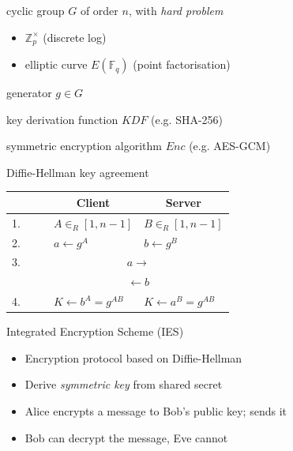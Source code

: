 \documentclass[ignorenonframetext,aspectratio=169]{beamer}
\begin{document}
\item cyclic group \(G\) of order \(n\), with \emph{hard problem}
  \begin{itemize}
  \item \(ℤ^\times_p\) (discrete log)
  \item elliptic curve \(E(𝔽_q)\) (point factorisation)
  \end{itemize}
\item generator \(g \in G\)
\item key derivation function $KDF$ (e.g. SHA-256)
\item symmetric encryption algorithm \(Enc\) (e.g. AES-GCM)

\begin{frame}{Diffie-Hellman key agreement}
\protect\hypertarget{diffie-hellman}{}
\begin{center}
\def\arraystretch{1.5}%
\begin{tabular}{ l l l }
    ~ & \multicolumn{1}{c}{Client} & \multicolumn{1}{c}{Server} \\ \hline
    {\small 1.~~~~} & $A \in_R [1, n-1]$ & $B \in_R [1, n-1]$ \\
    {\small 2.~~~~} & $a \gets g^A$      & $b \gets g^B$ \\
    {\small 3.~~~~} & \multicolumn{2}{c}{$ a \to $} \\
                    & \multicolumn{2}{c}{$ \gets b $} \\
    {\small 4.~~~~} & $ K \gets b^A = g^{AB} $ & $ K \gets a^B = g^{AB} $ \\
\end{tabular}
\end{center}
\end{frame}

\begin{frame}{Integrated Encryption Scheme (IES)}
\protect\hypertarget{integrated-encryption-scheme}{}

\begin{itemize}
\item Encryption protocol based on Diffie-Hellman
\item Derive \emph{symmetric key} from shared secret
\item Alice encrypts a message to Bob's public key; sends it
\item Bob can decrypt the message, Eve cannot
\end{itemize}

\end{frame}
\end{document}
